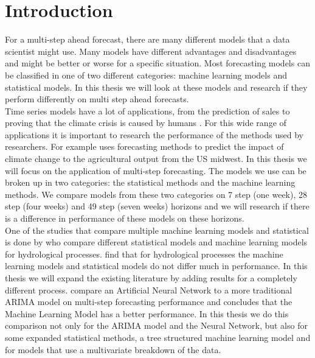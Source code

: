 \section{Introduction}
For a multi-step ahead forecast, there are many different models that a data scientist might use. Many models have different advantages and disadvantages and might be better or worse for a specific situation. Most forecasting models can be classified in one of two different categories: machine learning models and statistical models. In this thesis we will look at these models and research if they perform differently on multi step ahead forecasts.\\

Time series models have a lot of applications, from the prediction of sales \citep{Pavlyshenko2019Machine-LearningForecasting} to proving that the climate crisis is caused by humans \citep{Stern2013AnthropogenicChange}. For this wide range of applications it is important to research the performance of the methods used by researchers. For example \cite{Crane-Droesch2018MachineAgriculture} uses forecasting methods to predict the impact of climate change to the agricultural output from the US midwest. In this thesis we will focus on the application of multi-step forecasting. The models we use can be broken up in two categories: the statistical methods and the machine learning methods. We compare models from these two categories on 7 step (one week), 28 step (four weeks) and 49 step (seven weeks) horizons and we will research if there is a difference in performance of these models on these horizons.\\

One of the studies that compare multiple machine learning models and statistical is done by \cite{Papacharalampous2019ComparisonProcesses} who compare different statistical models and machine learning models for hydrological processes. \cite{Papacharalampous2019ComparisonProcesses} find that for hydrological processes the machine learning models and statistical models do not differ much in performance. In this thesis we will expand the existing literature by adding results for a completely different process. \cite{Alon2001ForecastingMethods} compare an Artificial Neural Network to a more traditional ARIMA model on multi-step forecasting performance and concludes that the Machine Learning Model has a better performance. In this thesis we do this comparison not only for the ARIMA model and the Neural Network, but also for some expanded statistical methods, a tree structured machine learning model and for models that use a multivariate breakdown of the data.\\

